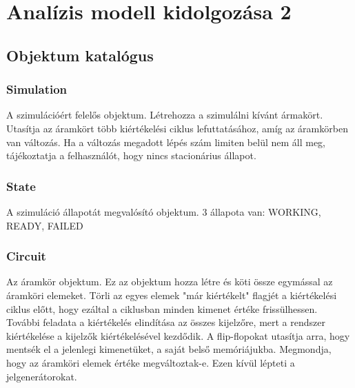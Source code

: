 %
\chapter{Analízis modell kidolgozása 2}

\thispagestyle{fancy}

\section{Objektum katalógus}

\subsection{\bf Simulation}
A szimulációért felelős objektum. Létrehozza a szimulálni kívánt ármakört. Utasítja az áramkört több kiértékelési ciklus lefuttatásához, amíg az áramkörben van változás. Ha a változás megadott lépés szám limiten belül nem áll meg, tájékoztatja a felhasználót, hogy nincs stacionárius állapot.

\subsection{\bf State}
A szimuláció állapotát megvalósító objektum. 3 állapota van: WORKING, READY, FAILED

\subsection{\bf Circuit}
Az áramkör objektum. Ez az objektum hozza létre és köti össze egymással az áramköri elemeket. Törli az egyes elemek "már kiértékelt" flagjét a kiértékelési ciklus előtt, hogy ezáltal a ciklusban minden kimenet értéke frissülhessen. További feladata a kiértékelés elindítása az összes kijelzőre, mert a rendszer kiértékelése a kijelzők kiértékelésével kezdődik. A flip-flopokat utasítja arra, hogy mentsék el a jelenlegi kimenetüket, a saját belső memóriájukba. Megmondja, hogy az áramköri elemek értéke megváltoztak-e. Ezen kívül lépteti a jelgenerátorokat.

